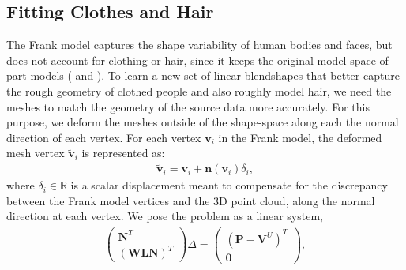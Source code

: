 \subsection{Fitting Clothes and Hair}
The Frank model captures the shape variability of human bodies and faces, but does not account for clothing or hair, since it keeps the original model space of part models (\cite{Loper2015} and \cite{cao2014facewarehouse}). To learn a new set of linear blendshapes that better capture the rough geometry of clothed people and also roughly model hair, we need the meshes to match the geometry of the source data more accurately. For this purpose, we deform the meshes outside of the shape-space along each the normal direction of each vertex. For each vertex $\mathbf{v}_i $ in the Frank model, the deformed mesh vertex $\tilde{\mathbf{v}}_i$ is represented as:
\begin{align}
\tilde{\mathbf{v}}_i  =  \mathbf{v}_i  + \mathbf{n}(\mathbf{v}_i) \delta_i,
\end{align}
where $\delta_i \in \mathds{R} $ is a scalar displacement meant to compensate for the discrepancy between the Frank model vertices and the 3D point cloud, along the normal direction at each vertex. 
We pose the problem as a linear system,
%
\begin{align}
\label{eq:delta_recon}
\begin{pmatrix} \mathbf{N}^T  \\ (\mathbf{W} \mathbf{L} \mathbf{N})^T  \end{pmatrix} \Delta
= \begin{pmatrix} (\mathbf{P} - \mathbf{V}^U)^T \\ \mathbf{0} \end{pmatrix},
\end{align}
